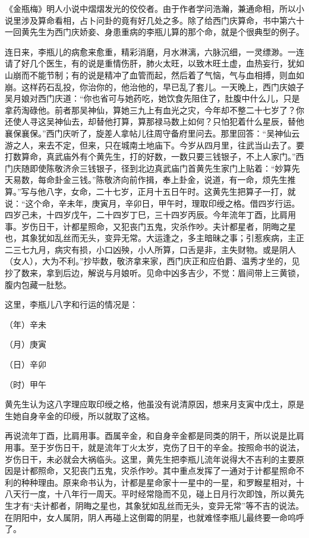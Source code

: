 \documentclass[a5paper,oneside,12pt]{ctexbook}
\begin{document}
《金瓶梅》明人小说中熠熠发光的佼佼者。由于作者学问浩瀚，兼通命相，所以小说里涉及算命看相，占卜问卦的竟有好几处之多。除了给西门庆算命，书中第六十一回黄先生为西门庆娇妾、身患重病的李瓶儿算的那个命，就是个很典型的例子。

连日来，李瓶儿的病愈来愈重，精彩消磨，月水淋漓，六脉沉细，一灵缥渺。一连请了好几个医生，有的说是重情伤肝，肺火太旺，以致木旺土虚，血热妄行，犹如山崩而不能节制；有的说是精冲了血管而起，然后着了气恼，气与血相搏，则血如崩。这样药石乱投，你治你的，他治他的，早已乱了套儿。一天晚上，西门庆娘子吴月娘对西门庆道：“你也省可与她药吃，她饮食先阻住了，肚腹中什么儿，只是拿药淘碌他。前者那吴神仙，算她三九上有血光之灾，今年却不整二十七岁了？你还使人寻这吴神仙去，却替他打算，算那禄马数上如何？只怕犯着什么星辰，替他襄保襄保。”西门庆听了，旋差人拿帖儿往周守备府里问去。那里回答：“吴神仙云游之人，来去不定，但来，只在城南土地庙下。今岁从四月里，往武当山去了。要打数算命，真武庙外有个黄先生，打的好数，一数只要三钱银子，不上人家门。”西门庆随即使陈敬济佘三钱银子，径到北边真武庙门首黄先生家门上贴着：“妙算先天易数，每命卦金三钱。”陈敬济向前作揖，奉上卦金，说道，有一命，烦先生推算。”写与他八字，女命，二十七岁，正月十五日午时。这黄先生把算子一打，就说：“这个命，辛未年，庚寅月，辛卯日，甲午时，理取印绶之格。借四岁行运。四岁己未，十四岁戊午，二十四岁丁巳，三十四岁丙辰。今年流年丁酉，比肩用事。岁伤日干，计都星照命，又犯丧门五鬼，灾杀作吵。夫计都星者，阴晦之星也，其象犹如乱丝而无头，变异无常。大运逢之，多主暗昧之事；引惹疾病，主正二三七九月，病灾有损，小口凶殃，小人所算，口舌是非，主失财物。或是阴人（女人），大为不利。”抄毕数，敬济拿来家，西门庆正和应伯爵、温秀才坐的，见抄了数来，拿到后边，解说与月娘听。见命中凶多吉少，不觉：眉间带上三黄锁，腹内包藏一肚愁。

这里，李瓶儿八字和行运的情况是：

（年）辛未\par
（月）庚寅\par
（日）辛卯\par
（时）甲午

黄先生认为这八字理应取印绶之格，他虽没有说清原因，想来月支寅中戊土，原是生她自身辛金的印绶，所以就取了这格。

再说流年丁酉，比肩用事。酉属辛金，和自身辛金都是同类的阴干，所以说是比肩用事。至于岁伤日干，就是流年丁火太岁，克伤了日干的辛金。按照命书的说法，岁伤日干，未必就会大祸临头。这里，黄先生把李瓶儿流年说得大不吉利的主要原因是计都照命，又犯丧门五鬼，灾杀作吵。其中重点发挥了一通对于计都星照命不利的种种理由。原来命书认为，计都是星命家十一星中的一星，和罗睺星相对，十八天行一度，十八年行一周天。平时经常隐而不见，碰上日月行次即蚀，所以黄先生才有“夫计都者，阴晦之星也，其象犹如乱丝而无头，变异无常”等不吉的说法。在阴阳中，女人属阴，阴人再碰上这倒霉的阴星，也就难怪李瓶儿最终要一命呜呼了。
\end{document}
